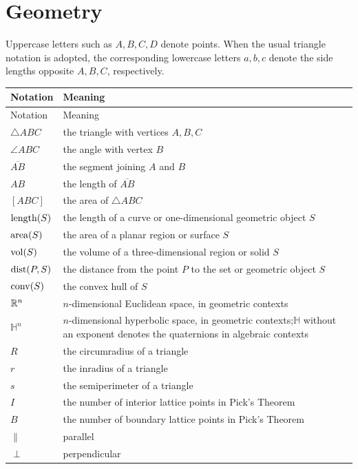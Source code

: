     \section*{Geometry}

    Uppercase letters such as $A,B,C,D$ denote points. When the usual triangle
    notation is adopted, the corresponding lowercase letters $a,b,c$ denote the
    side lengths opposite $A,B,C$, respectively.

    \vspace{0.5em}

    {\small
    \renewcommand{\arraystretch}{1.18}
    \begin{longtable}{@{}L{0.24\textwidth}L{0.68\textwidth}@{}}
        \toprule
        Notation & Meaning \\
        \midrule
        \endfirsthead

        \toprule
        Notation & Meaning \\
        \midrule
        \endhead

        \bottomrule
        \endlastfoot

        $\triangle ABC$ & the triangle with vertices $A,B,C$ \\
        $\angle ABC$ & the angle with vertex $B$ \\
        $\overline{AB}$ & the segment joining $A$ and $B$ \\
        $AB$ & the length of $\overline{AB}$ \\
        $[ABC]$ & the area of $\triangle ABC$ \\
        $\operatorname{length}(S)$ & the length of a curve or one-dimensional geometric object $S$ \\
        $\operatorname{area}(S)$ & the area of a planar region or surface $S$ \\
        $\operatorname{vol}(S)$ & the volume of a three-dimensional region or solid $S$ \\
        $\operatorname{dist}(P,S)$ & the distance from the point $P$ to the set or geometric object $S$ \\
        $\operatorname{conv}(S)$ & the convex hull of $S$ \\
        $\mathbb{R}^n$ & $n$-dimensional Euclidean space, in geometric contexts \\
        $\mathbb{H}^n$ & $n$-dimensional hyperbolic space, in geometric contexts;\newline $\mathbb{H}$ without an exponent denotes the quaternions in algebraic contexts \\
        $R$ & the circumradius of a triangle \\
        $r$ & the inradius of a triangle \\
        $s$ & the semiperimeter of a triangle \\
        $I$ & the number of interior lattice points in Pick's Theorem \\
        $B$ & the number of boundary lattice points in Pick's Theorem \\
        $\parallel$ & parallel \\
        $\perp$ & perpendicular \\
    \end{longtable}
    }

